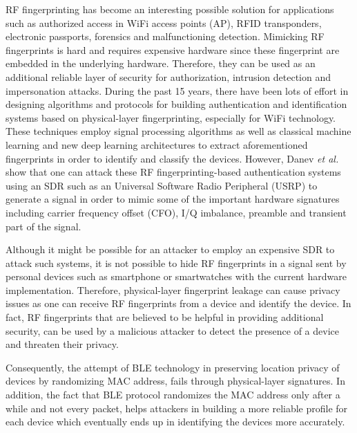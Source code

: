RF fingerprinting has become an interesting possible solution for applications such as authorized access in WiFi access points (AP), RFID transponders, electronic passports, forensics and malfunctioning detection. Mimicking RF fingerprints is hard and requires expensive hardware since these fingerprint are embedded in the underlying hardware. Therefore, they can be used as an additional reliable layer of security for authorization, intrusion detection and impersonation attacks. During the past 15 years, there have been lots of effort in designing algorithms and protocols for building authentication and identification systems based on physical-layer fingerprinting, especially for WiFi technology. These techniques employ signal processing algorithms as well as classical machine learning and new deep learning architectures to extract aforementioned fingerprints in order to identify and classify the devices. However, Danev \textit{et al.} \cite{physicalattack_danev} show that one can attack these RF fingerprinting-based authentication systems using an SDR such as an Universal Software Radio Peripheral (USRP) to generate a signal in order to mimic some of the important hardware signatures including carrier frequency offset (CFO), I/Q imbalance, preamble and transient part of the signal.

Although it might be possible for an attacker to employ an expensive SDR to attack such systems, it is not possible to hide RF fingerprints in a signal sent by personal devices such as smartphone or smartwatches with the current hardware implementation. Therefore, physical-layer fingerprint leakage can cause privacy issues as one can receive RF fingerprints from a device and identify the device. In fact, RF fingerprints that are believed to be helpful in providing additional security, can be used by a malicious attacker to detect the presence of a device and threaten their privacy. 
\begin{comment}
    Moreover, identifying a device will make the tracking of a device possible as one can use multiple high-end receivers and analyze RF fingerprints after removing relative effects of different receivers. 
\end{comment}
Consequently, the attempt of BLE technology in preserving location privacy of devices by randomizing MAC address, fails through physical-layer signatures. In addition, the fact that BLE protocol randomizes the MAC address only after a while and not every packet, helps attackers in building a more reliable profile for each device which eventually ends up in identifying the devices more accurately.

